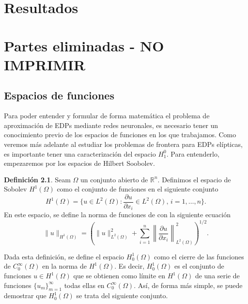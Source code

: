 \documentclass[a4paper,11pt,spanish, twoside, leqno]{tfg-uam}
\theoremstyle{definition}
\newtheorem{defin}[teor]{Definici\'on}
\begin{document}
\chapter{Resultados}\label{chap3}

\chapter{Partes eliminadas - NO IMPRIMIR}
\section{Espacios de funciones}

Para poder entender y formular de forma matemática el problema de aproximación de EDPs mediante redes neuronales, es necesario tener un conocimiento previo de los espacios de funciones en los que trabajamos. Como veremos más adelante al estudiar los problemas de frontera para EDPs elípticas, es importante tener una caracterización del espacio $H_1^0$. Para entenderlo, empezaremos por los espacios de Hilbert Soobolev.

\begin{mdframed}
\begin{defin}
    Seam $\Omega$ un conjunto abierto de $\mathbb{R}^n$. Definimos el espacio de Sobolev $H^1(\Omega)$ como el conjunto de funciones en el siguiente conjunto
    \begin{equation}
        H^1(\Omega)=\{u\in L^2(\Omega): \frac{\partial u}{\partial x_i}\in L^2(\Omega), \, i=1,\dots,n\}.
    \end{equation}
    En este espacio, se define la norma de funciones de con la siguiente ecuación
    \begin{equation}
        \|u\|_{H^1(\Omega)}=\left(\|u\|^2_{L^2(\Omega)} + \sum_{i=1}^{n}\left\|\frac{\partial u}{\partial x_i}\right\|^2_{L^2(\Omega)}\right)^{1/2}.
    \end{equation}
\end{defin}
\end{mdframed}

Dada esta definición, se define el espacio $H_0^1(\Omega)$ como el cierre de las funciones de $C_0^\infty(\Omega)$ en la norma de $H^1(\Omega)$. Es decir, $H_0^1(\Omega)$ es el conjunto de funciones $u\in H^1(\Omega)$ que se obtienen como límite en $H^1(\Omega)$ de una serie de funciones $\{u_m\}_{m=1}^\infty$ todas ellas en $C_0^\infty(\Omega)$. Así, de forma más simple, se puede demostrar que $H_0^1(\Omega)$ se trata del siguiente conjunto.
\end{document}

